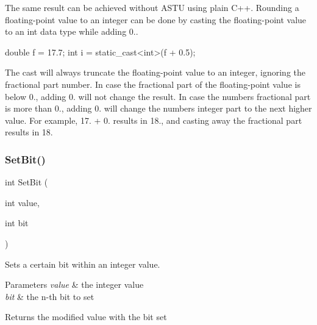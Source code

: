 The same result can be achieved without A\+S\+TU using plain C++. Rounding a floating-\/point value to an integer can be done by casting the floating-\/point value to an int data type while adding 0..


\begin{DoxyCode}
\textcolor{keywordtype}{double} f = 17.7;
\textcolor{keywordtype}{int} i = \textcolor{keyword}{static\_cast<}\textcolor{keywordtype}{int}\textcolor{keyword}{>}(f + 0.5);
\end{DoxyCode}


The cast will always truncate the floating-\/point value to an integer, ignoring the fractional part number. In case the fractional part of the floating-\/point value is below 0., adding 0. will not change the result. In case the number\textquotesingle{}s fractional part is more than 0., adding 0. will change the number\textquotesingle{}s integer part to the next higher value. For example, 17. + 0. results in 18., and casting away the fractional part results in 18. \mbox{\label{group__math__group_ga8c8748fbb1d3e99db79f20fc17d4e63b}} 
\subsubsection{\texorpdfstring{Set\+Bit()}{SetBit()}}
{\footnotesize\ttfamily int Set\+Bit (\begin{DoxyParamCaption}\item[{int}]{value,  }\item[{int}]{bit }\end{DoxyParamCaption})}

Sets a certain bit within an integer value.


\begin{DoxyParams}{Parameters}
{\em value} & the integer value \\
\hline
{\em bit} & the n-\/th bit to set \\
\hline
\end{DoxyParams}
\begin{DoxyReturn}{Returns}
the modified value with the bit set 
\end{DoxyReturn}
\mbox{\label{group__math__group_gab62eb7c4d19d31b0e0ac5f89a126b199}} 
